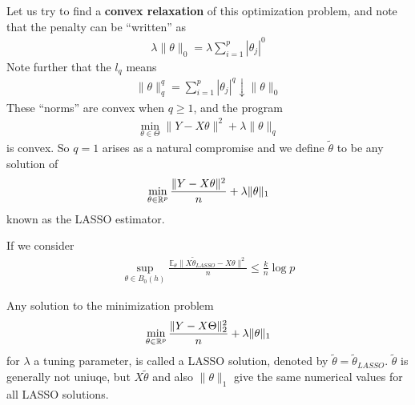 Let us try to find a \textbf{convex relaxation} of this optimization
problem, and note that the penalty can be ``written'' as
\begin{align}
  \label{eq:113}
  \lambda \| \theta \|_{0} = \lambda \sum_{i=1}^{p} |\theta_{j}|^{0}
\end{align}  Note further that the $l_{q}$ means
\begin{align}
  \label{eq:114}
  \| \theta \|_{q}^{q} = \sum_{i=1}^{p} |\theta_{j}|^{q} \downarrow
  \| \theta \|_{0}
\end{align}  These ``norms'' are convex when $q \geq 1$, and the
program
\begin{align}
  \label{eq:115}
  \min_{\theta \in \Theta} \| Y - X \theta \|^{2} + \lambda \| \theta \|_{q}
\end{align} is convex.  So $q = 1$ arises as a natural compromise and
we define $\tilde \theta$ to be any solution of
\begin{align}
  \label{eq:116}
  \min_{\theta \in \mathbb{R}^{p}} \frac{\| Y - X \theta \|^{2}}{n} + \lambda
  \| \theta \|_{1}
\end{align} known as the LASSO estimator.

If we consider
\begin{align}
  \label{eq:117}
  \sup_{\theta \in B_{0}(h)} \frac{\mathbb{E}_{\theta} \| X \tilde
  \theta_{LASSO} - X \theta \|^{2}}{n} \leq \frac{k}{n} \log p
\end{align} 


Any solution to the minimization problem
\begin{align}
  \label{eq:105}
  \min_{\theta \in \mathbb{R}^{p}} \frac{\| Y - X \Theta \|^{2}_{2}}{n} +
  \lambda \| \theta \|_{1}
\end{align} for $\lambda$ a tuning parameter, is called a LASSO
solution, denoted by $\tilde \theta = \tilde \theta_{LASSO}$.  $\tilde
\theta$ is generally not uniuqe, but $X \tilde \theta$ and also $\|
\theta \|_{1}$ give the same numerical values for all LASSO
solutions.

